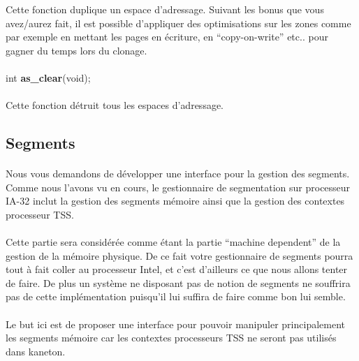\documentclass[10pt,a4wide]{article}
\begin{document}
Cette fonction duplique un espace d'adressage. Suivant les bonus que vous
avez/aurez fait, il est possible d'appliquer des optimisations sur les zones
comme par exemple en mettant les pages en \'ecriture, en ``copy-on-write''
etc.. pour gagner du temps lors du clonage.

\paragraph{}

\hspace{1.5cm}int \textbf{as\_clear}(void);

\paragraph{}

Cette fonction d\'etruit tous les espaces d'adressage.

\subsection{Segments}

\paragraph{}

Nous vous demandons de d\'evelopper une interface pour la gestion des
segments. Comme nous l'avons vu en cours, le gestionnaire
de segmentation sur processeur IA-32 inclut la gestion des segments
m\'emoire ainsi que la gestion des contextes processeur TSS.

\paragraph{}

Cette partie sera consid\'er\'ee comme \'etant la partie ``machine
dependent'' de la gestion de la m\'emoire physique. De ce fait votre
gestionnaire de segments pourra tout \`a fait coller au processeur
Intel, et c'est d'ailleurs ce que nous allons tenter de faire.
De plus un syst\`eme ne disposant pas de notion de segments ne souffrira
pas de cette impl\'ementation puisqu'il lui suffira de faire comme bon
lui semble.

\paragraph{}

Le but ici est de proposer une interface pour pouvoir manipuler principalement
les segments m\'emoire car les contextes processeurs TSS ne seront pas
utilis\'es dans kaneton.
\end{document}
